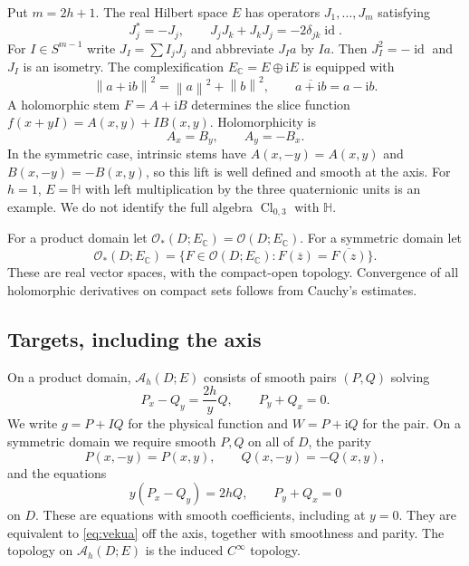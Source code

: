 \documentclass[11pt,a4paper]{article}
\numberwithin{equation}{section}
\theoremstyle{definition}
\theoremstyle{remark}
\newcommand{\C}{\mathbb C}
\newcommand{\ii}{\mathrm i}
\newcommand{\HH}{\mathbb H}
\newcommand{\Cl}{\operatorname{Cl}}
\newcommand{\Hol}{\mathcal O}
\newcommand{\A}{\mathcal A_h}
\newcommand{\norm}[1]{\left\lVert#1\right\rVert}
\newcommand{\barz}{\overline z}
\newcommand{\id}{\operatorname{id}}
\begin{document}
Put $m=2h+1$. The real Hilbert space $E$ has operators $J_1,\ldots,J_m$
satisfying
\begin{equation}\label{eq:clifford}
 J_j^*=-J_j,\qquad J_jJ_k+J_kJ_j=-2\delta_{jk}\id.
\end{equation}
For $I\in S^{m-1}$ write $J_I=\sum I_jJ_j$ and abbreviate $J_Ia$ by $Ia$.
Then $J_I^2=-\id$ and $J_I$ is an isometry. The complexification
$E_\C=E\oplus\ii E$ is equipped with
\[
 \norm{a+\ii b}^2=\norm a^2+\norm b^2,
 \qquad \overline{a+\ii b}=a-\ii b.
\]
A holomorphic stem $F=A+\ii B$ determines the slice function
$f(x+yI)=A(x,y)+IB(x,y)$. Holomorphicity is
\begin{equation}\label{eq:CR}
 A_x=B_y,\qquad A_y=-B_x.
\end{equation}
In the symmetric case, intrinsic stems have $A(x,-y)=A(x,y)$ and
$B(x,-y)=-B(x,y)$, so this lift is well defined and smooth at the axis.
For $h=1$, $E=\HH$ with left multiplication by the three quaternionic units
is an example. We do not identify the full algebra $\Cl_{0,3}$ with $\HH$.

For a product domain let $\Hol_*(D;E_\C)=\Hol(D;E_\C)$. For a symmetric
domain let
\[
 \Hol_*(D;E_\C)=\{F\in\Hol(D;E_\C):F(\barz)=\overline{F(z)}\}.
\]
These are real vector spaces, with the compact-open topology. Convergence of
all holomorphic derivatives on compact sets follows from Cauchy's estimates.

\subsection{Targets, including the axis}

On a product domain, $\A(D;E)$ consists of smooth pairs $(P,Q)$ solving
\begin{equation}\label{eq:vekua}
 P_x-Q_y=\frac{2h}{y}Q,\qquad P_y+Q_x=0.
\end{equation}
We write $g=P+IQ$ for the physical function and $W=P+\ii Q$ for the pair.
On a symmetric domain we require smooth $P,Q$ on all of $D$, the parity
\begin{equation}\label{eq:parity}
 P(x,-y)=P(x,y),\qquad Q(x,-y)=-Q(x,y),
\end{equation}
and the equations
\begin{equation}\label{eq:smooth-vekua}
 y(P_x-Q_y)=2hQ,\qquad P_y+Q_x=0
\end{equation}
on $D$. These are equations with smooth coefficients, including at $y=0$.
They are equivalent to \eqref{eq:vekua} off the axis, together with smoothness
and parity. The topology on $\A(D;E)$ is the induced $C^\infty$ topology.
\end{document}
